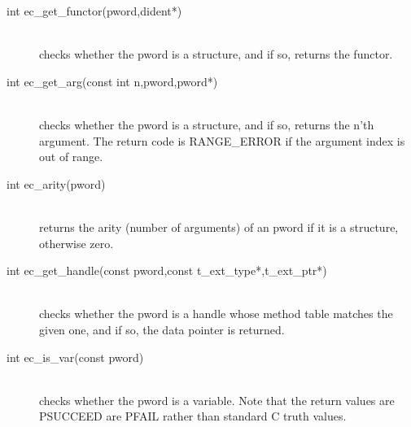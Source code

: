 \begin{description}
\item[int		ec_get_functor(pword,dident*)]\ \\
	checks whether the {\eclipse} pword is a structure, and if so,
	returns the functor.

\item[int		ec_get_arg(const int n,pword,pword*)]\ \\
	checks whether the {\eclipse} pword is a structure, and if so,
	returns the n'th argument. The return code is RANGE_ERROR
	if the argument index is out of range.

\item[int		ec_arity(pword)]\ \\
	returns the arity (number of arguments) of an {\eclipse} pword
	if it is a structure, otherwise zero.

\item[int		ec_get_handle(const pword,const t_ext_type*,t_ext_ptr*)]\ \\
	checks whether the {\eclipse} pword is a handle whose method table
	matches the given one, and if so, the data pointer is returned.

\item[int		ec_is_var(const pword)]\ \\
	checks whether the {\eclipse} pword is a variable.
	Note that the return values are PSUCCEED are PFAIL
	rather than standard C truth values.

\end{description}


